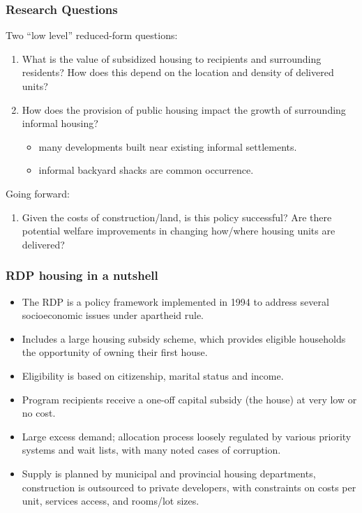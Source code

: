 \documentclass[aspectratio=149]{beamer}
\begin{document}

\begin{frame}
\frametitle{Research Questions}
Two ``low level'' reduced-form questions:
  \begin{enumerate}
    [square]
    \item What is the value of subsidized housing to recipients and surrounding residents? How does this depend on the location and density of delivered units?
    \item How does the provision of public housing impact the growth of surrounding informal housing?
      \begin{itemize}
    \item many developments built near existing informal settlements.
    \item informal backyard shacks are common occurrence.
  \end{itemize}
  \end{enumerate}
  \vspace{1mm}
Going forward:  
\begin{enumerate}
  [square]
  \setcounter{enumi}{2}
  \item Given the costs of construction/land, is this policy successful? Are there potential welfare improvements in changing how/where housing units are delivered?
\end{enumerate}


\end{frame}



\begin{frame}
\frametitle{RDP housing in a nutshell }
  \begin{itemize}
    \item The RDP is a policy framework implemented in 1994 to address several socioeconomic issues under apartheid rule.
    \item Includes a large housing subsidy scheme, which provides eligible households the opportunity of owning their first house.
    \item Eligibility is based on citizenship, marital status and income.
    \item Program recipients receive a one-off capital subsidy (the house) at very low or no cost.
    \item Large excess demand; allocation process loosely regulated by various priority systems and wait lists, with many noted cases of corruption.
    \item Supply is planned by municipal and provincial housing departments, construction is outsourced to private developers, with constraints on costs per unit, services access, and rooms/lot sizes.
  \end{itemize}



\end{frame}
\end{document}
